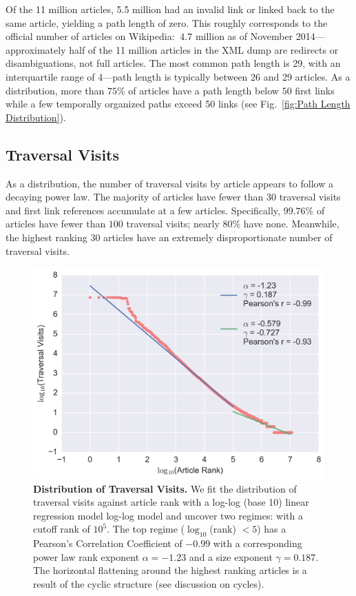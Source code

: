\documentclass[11pt]{report}
\begin{document}
Of the 11 million articles, 5.5 million had an invalid link or linked back to the same article, yielding a path length of zero. 
This roughly corresponds to the official number of articles on Wikipedia: 
$~4.7$ million as of November 2014---approximately half of the 11 million 
articles in the XML dump are redirects or disambiguations, not full articles.
The most common path length is 29, with an interquartile range of 4---path length
is typically between 26 and 29 articles.
As a distribution, more than $75\%$ of articles have a path length below 
$50$ first links 
while a few temporally organized paths exceed 50 links 
(see Fig.~\ref{fig:Path Length Distribution}). 



\subsection{Traversal Visits}

As a distribution, the number of traversal visits by article appears to follow a decaying power law. 
The majority of articles have fewer than 30 traversal visits and
first link references accumulate at a few articles.
Specifically, $99.76\%$ of articles have fewer than $100$ traversal visits; nearly $80\%$ have none. 
Meanwhile, the highest ranking 30 articles have an extremely disproportionate number of traversal visits.

\begin{figure}[tp!]
  \includegraphics[width=\columnwidth]{graphics/traversals_per_article.png} 
  \caption{
    \textbf{Distribution of Traversal Visits.}
We fit the distribution of traversal visits against article rank with a log-log (base 10) linear regression model log-log model and uncover two regimes: 
with a cutoff rank of $10^{5}$.
The top regime ($\log_{10}$(rank) $< 5$) has a Pearson's Correlation 
Coefficient of $-0.99$ with a corresponding power law rank exponent 
$\alpha = -1.23$ and a size exponent $\gamma = 0.187$.
The horizontal flattening around the highest
ranking articles is a result of the cyclic structure (see discussion on cycles).}
  \label{fig:Distribution of Visits}

\end{figure}
\end{document}
